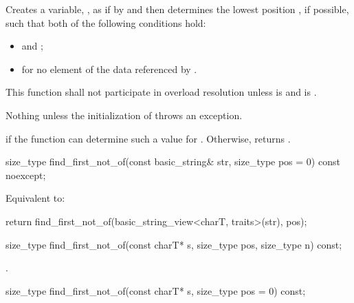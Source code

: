 \begin{itemdescr}
\pnum
\effects
Creates a variable, , as if by
 and then
determines the lowest position , if possible, such that both of
the following conditions hold:
\begin{itemize}
\item
{}
and
;
\item
{}%
for no element  of the data referenced by .
\end{itemize}

\pnum
\remarks
This function shall not participate in overload resolution unless
 is  and
 is .

\pnum
\throws
Nothing unless the initialization of  throws an exception.

\pnum
\returns
{} if the function can determine such a value for .
Otherwise, returns
.
\end{itemdescr}

%
\begin{itemdecl}
size_type find_first_not_of(const basic_string& str, size_type pos = 0) const noexcept;
\end{itemdecl}

\begin{itemdescr}
\pnum
\effects
Equivalent to:
\begin{codeblock}
return find_first_not_of(basic_string_view<charT, traits>(str), pos);
\end{codeblock}
\end{itemdescr}

%
\begin{itemdecl}
size_type find_first_not_of(const charT* s, size_type pos, size_type n) const;
\end{itemdecl}

\begin{itemdescr}
\pnum
\returns
{}.
\end{itemdescr}

%
\begin{itemdecl}
size_type find_first_not_of(const charT* s, size_type pos = 0) const;
\end{itemdecl}

